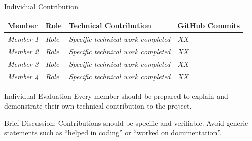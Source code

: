 \documentclass[aspectratio=169,11pt]{beamer}
\newcommand{\smallnote}[1]{%
\vspace{0.08cm}
{\scriptsize\color{GEUGrey}#1}
}
\newcommand{\placeholder}[1]{%
\textit{\color{GEUGrey}#1}
}
\begin{document}
\begin{frame}{Individual Contribution}

\scriptsize

\begin{center}

\renewcommand{\arraystretch}{1.35}

\begin{tabularx}{.96\textwidth}
{@{}p{2.0cm}p{2.0cm}X p{1.6cm}@{}}

\toprule
Member &
Role &
Technical Contribution &
GitHub Commits\\
\midrule

\placeholder{Member 1} &
\placeholder{Role} &
\placeholder{Specific technical work completed} &
\placeholder{XX}\\

\placeholder{Member 2} &
\placeholder{Role} &
\placeholder{Specific technical work completed} &
\placeholder{XX}\\

\placeholder{Member 3} &
\placeholder{Role} &
\placeholder{Specific technical work completed} &
\placeholder{XX}\\

\placeholder{Member 4} &
\placeholder{Role} &
\placeholder{Specific technical work completed} &
\placeholder{XX}\\

\bottomrule

\end{tabularx}

\end{center}

\vspace{3mm}

\begin{block}{Individual Evaluation}
Every member should be prepared to explain and demonstrate
their own technical contribution to the project.
\end{block}

\smallnote{
Brief Discussion: Contributions should be specific and verifiable.
Avoid generic statements such as ``helped in coding'' or
``worked on documentation''.
}

\end{frame}
\end{document}

